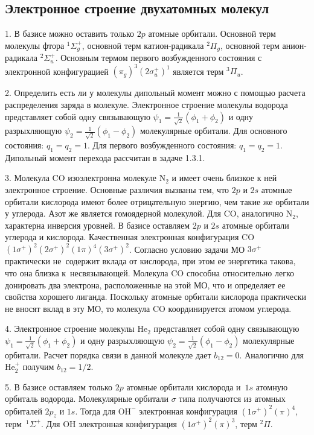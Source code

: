 \subsection{Электронное строение двухатомных молекул}
1. В базисе можно оставить только $2p$ атомные орбитали. Основной терм молекулы фтора $^1\Sigma_g^+$, основной терм катион-радикала $^2\Pi_g$, основной терм анион-радикала $^2\Sigma_u^+$. Основным термом первого возбужденного состояния с электронной конфигурацией $(\pi_g)^3(2\sigma_u^+)^1$ является терм $^3\Pi_u$.\par
2. Определить есть ли у молекулы дипольный момент можно с помощью расчета распределения заряда в молекуле. Электронное строение молекулы водорода представляет собой одну связывающую $\psi_1=\frac{1}{\sqrt2}(\phi_1+\phi_2)$ и одну разрыхляющую $\psi_2=\frac{1}{\sqrt2}(\phi_1-\phi_2)$ молекулярные орбитали. Для основного состояния: $q_1=q_2=1$. Для первого возбужденного состояния: $q_1=q_2=1$. Дипольный момент перехода рассчитан в задаче 1.3.1.\par
3. Молекула CO изоэлектронна молекуле N$_2$ и имеет очень близкое к ней электронное строение. Основные различия вызваны тем, что $2p$ и $2s$ атомные орбитали кислорода имеют более отрицательную энергию, чем такие же орбитали у углерода. Азот же является гомоядерной молекулой. Для CO, аналогично N$_2$, характерна инверсия уровней. В базисе оставляем $2p$ и $2s$ атомные орбитали углерода и кислорода. Качественная электронная конфигурация CO~$(1\sigma^+)^2(2\sigma^+)^2(1\pi)^4(3\sigma^+)^2$. Согласно условию задачи МО $3\sigma^+$ практически не~содержит вклада от кислорода, при этом ее энергетика такова, что она близка к~несвязывающей. Молекула CO способна относительно легко донировать два электрона, расположенные на этой МО, что и определяет ее свойства хорошего лиганда. Поскольку атомные орбитали кислорода практически не вносят вклад в эту МО, то молекула CO координируется атомом углерода.\par
4. Электронное строение молекулы $\text{He}_2$ представляет собой одну связывающую $\psi_1=\frac{1}{\sqrt2}(\phi_1+\phi_2)$ и одну разрыхляющую $\psi_2=\frac{1}{\sqrt2}(\phi_1-\phi_2)$ молекулярные орбитали. Расчет порядка связи в данной молекуле дает $b_{12}=0$. Аналогично для $\text{He}_2^{+}$ получим $b_{12}=1/2$.\par
5. В базисе оставляем только $2p$ атомные орбитали кислорода и~$1s$ атомную орбиталь водорода. Молекулярные орбитали $\sigma$ типа получаются из атомных орбиталей $2p_z$ и $1s$. Тогда для $\text{OH}^-$ электронная конфигурация $(1\sigma^+)^2(\pi)^4$, терм~$^1\Sigma^+$. Для $\text{OH}$ электронная конфигурация $(1\sigma^+)^2(\pi)^3$, терм $^2\Pi$.\par
